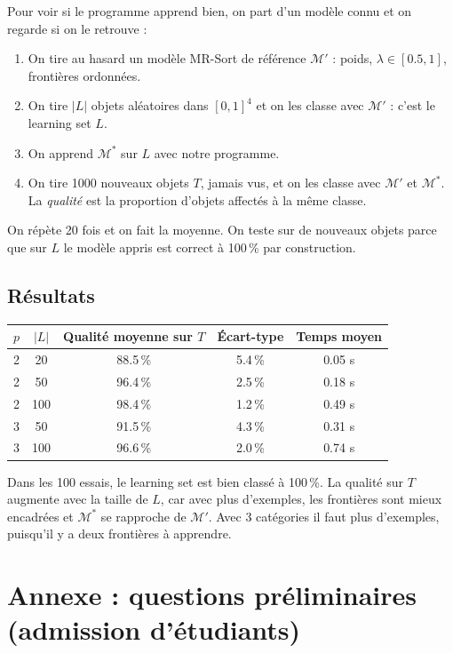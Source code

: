 \documentclass[10pt,a4paper]{article}
\begin{document}
Pour voir si le programme apprend bien, on part d'un modèle connu et on regarde si on le retrouve :
\begin{enumerate}
  \item On tire au hasard un modèle MR-Sort de référence $\mathcal{M}'$ : poids, $\lambda\in[0.5,1]$, frontières ordonnées.
  \item On tire $|L|$ objets aléatoires dans $[0,1]^4$ et on les classe avec $\mathcal{M}'$ : c'est le learning set $L$.
  \item On apprend $\mathcal{M}^*$ sur $L$ avec notre programme.
  \item On tire 1000 nouveaux objets $T$, jamais vus, et on les classe avec $\mathcal{M}'$ et $\mathcal{M}^*$.
        La \emph{qualité} est la proportion d'objets affectés à la même classe.
\end{enumerate}
On répète 20 fois et on fait la moyenne. On teste sur de nouveaux objets parce que sur $L$ le modèle appris est
correct à 100\,\% par construction.

\subsection*{Résultats}

\begin{center}
\begin{tabular}{ccccc}
\toprule
$p$ & $|L|$ & Qualité moyenne sur $T$ & Écart-type & Temps moyen \\
\midrule
2 & 20  & 88.5\,\% & 5.4\,\% & 0.05 s \\
2 & 50  & 96.4\,\% & 2.5\,\% & 0.18 s \\
2 & 100 & 98.4\,\% & 1.2\,\% & 0.49 s \\
3 & 50  & 91.5\,\% & 4.3\,\% & 0.31 s \\
3 & 100 & 96.6\,\% & 2.0\,\% & 0.74 s \\
\bottomrule
\end{tabular}
\end{center}

Dans les 100 essais, le learning set est bien classé à 100\,\%. La qualité sur $T$ augmente avec la taille de $L$,
car avec plus d'exemples, les frontières sont mieux encadrées et $\mathcal{M}^*$ se rapproche de $\mathcal{M}'$. Avec 3 catégories
il faut plus d'exemples, puisqu'il y a deux frontières à apprendre.


\newpage
\section*{Annexe : questions préliminaires (admission d'étudiants)}
\end{document}
